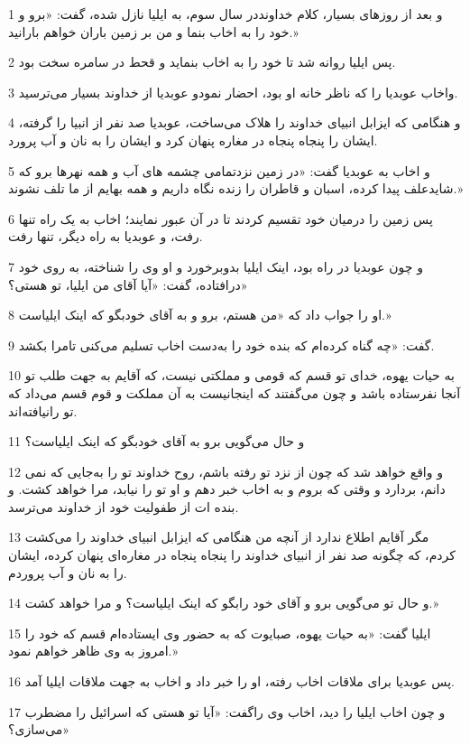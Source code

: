 \par 1 و بعد از روزهای بسیار، کلام خداونددر سال سوم، به ایلیا نازل شده، گفت: «برو و خود را به اخاب بنما و من بر زمین باران خواهم بارانید.»
\par 2 پس ایلیا روانه شد تا خود را به اخاب بنماید و قحط در سامره سخت بود.
\par 3 واخاب عوبدیا را که ناظر خانه او بود، احضار نمودو عوبدیا از خداوند بسیار می‌ترسید.
\par 4 و هنگامی که ایزابل انبیای خداوند را هلاک می‌ساخت، عوبدیا صد نفر از انبیا را گرفته، ایشان را پنجاه پنجاه در مغاره پنهان کرد و ایشان را به نان و آب پرورد.
\par 5 و اخاب به عوبدیا گفت: «در زمین نزدتمامی چشمه های آب و همه نهرها برو که شایدعلف پیدا کرده، اسبان و قاطران را زنده نگاه داریم و همه بهایم از ما تلف نشوند.»
\par 6 پس زمین را درمیان خود تقسیم کردند تا در آن عبور نمایند؛ اخاب به یک راه تنها رفت، و عوبدیا به راه دیگر، تنها رفت.
\par 7 و چون عوبدیا در راه بود، اینک ایلیا بدوبرخورد و او وی را شناخته، به روی خود درافتاده، گفت: «آیا آقای من ایلیا، تو هستی؟»
\par 8 او را جواب داد که «من هستم، برو و به آقای خودبگو که اینک ایلیاست.»
\par 9 گفت: «چه گناه کرده‌ام که بنده خود را به‌دست اخاب تسلیم می‌کنی تامرا بکشد.
\par 10 به حیات یهوه، خدای تو قسم که قومی و مملکتی نیست، که آقایم به جهت طلب تو آنجا نفرستاده باشد و چون می‌گفتند که اینجانیست به آن مملکت و قوم قسم می‌داد که تو رانیافته‌اند.
\par 11 و حال می‌گویی برو به آقای خودبگو که اینک ایلیاست؟
\par 12 و واقع خواهد شد که چون از نزد تو رفته باشم، روح خداوند تو را به‌جایی که نمی دانم، بردارد و وقتی که بروم و به اخاب خبر دهم و او تو را نیابد، مرا خواهد کشت. و بنده ات از طفولیت خود از خداوند می‌ترسد.
\par 13 مگر آقایم اطلاع ندارد از آنچه من هنگامی که ایزابل انبیای خداوند را می‌کشت کردم، که چگونه صد نفر از انبیای خداوند را پنجاه پنجاه در مغاره‌ای پنهان کرده، ایشان را به نان و آب پروردم.
\par 14 و حال تو می‌گویی برو و آقای خود رابگو که اینک ایلیاست؟ و مرا خواهد کشت.»
\par 15 ایلیا گفت: «به حیات یهوه، صبایوت که به حضور وی ایستاده‌ام قسم که خود را امروز به وی ظاهر خواهم نمود.»
\par 16 پس عوبدیا برای ملاقات اخاب رفته، او را خبر داد و اخاب به جهت ملاقات ایلیا آمد.
\par 17 و چون اخاب ایلیا را دید، اخاب وی راگفت: «آیا تو هستی که اسرائیل را مضطرب می‌سازی؟»
